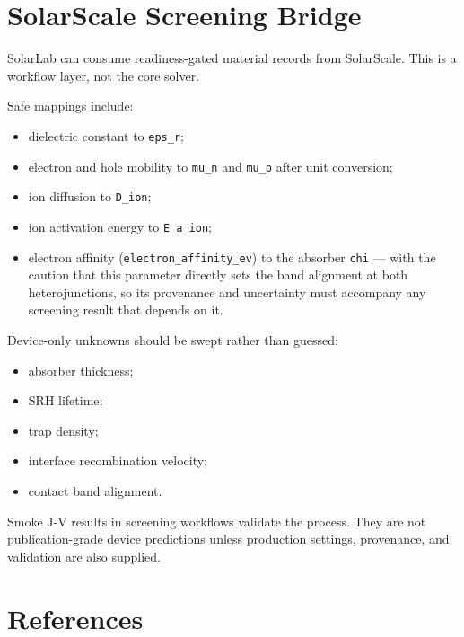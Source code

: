 \documentclass[
  11pt,
  american,
]{report}
\providecommand{\tightlist}{%
  \setlength{\itemsep}{0pt}\setlength{\parskip}{0pt}}
\begin{document}
\hypertarget{solarscale-screening-bridge}{%
\chapter{SolarScale Screening
Bridge}\label{solarscale-screening-bridge}}

SolarLab can consume readiness-gated material records from SolarScale.
This is a workflow layer, not the core solver.

Safe mappings include:

\begin{itemize}
\tightlist
\item
  dielectric constant to \texttt{eps\_r};
\item
  electron and hole mobility to \texttt{mu\_n} and \texttt{mu\_p} after
  unit conversion;
\item
  ion diffusion to \texttt{D\_ion};
\item
  ion activation energy to \texttt{E\_a\_ion};
\item
  electron affinity (\texttt{electron\_affinity\_ev}) to the absorber
  \texttt{chi} --- with the caution that this parameter directly sets
  the band alignment at both heterojunctions, so its provenance and
  uncertainty must accompany any screening result that depends on it.
\end{itemize}

Device-only unknowns should be swept rather than guessed:

\begin{itemize}
\tightlist
\item
  absorber thickness;
\item
  SRH lifetime;
\item
  trap density;
\item
  interface recombination velocity;
\item
  contact band alignment.
\end{itemize}

Smoke J-V results in screening workflows validate the process. They are
not publication-grade device predictions unless production settings,
provenance, and validation are also supplied.

\hypertarget{references}{%
\chapter{References}\label{references}}
\end{document}
